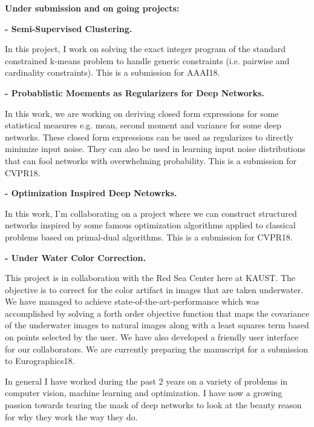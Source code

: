 \documentclass[article]{llncs}
\begin{document}
\noindent \textbf{Under submission and on going projects:}

\noindent \textbf{- Semi-Supervised Clustering.}

In this project, I work on solving the exact integer program of the standard constrained k-means problem to handle generic constraints (i.e. pairwise and cardinality constraints). This is a submission for AAAI18.
\newline



\noindent \textbf{- Probablistic Moements as Regularizers for Deep Networks.}

In this work, we are working on deriving closed form expressions for some statistical measures e.g. mean, second moment and variance for some deep networks. These closed form expressions can be used as regularizes to directly minimize input noise. They can also be used in learning input noise distributions that can fool networks with overwhelming probability. This is a submission for CVPR18.
\newline


\noindent \textbf{- Optimization Inspired Deep Netowrks.}

In this work, I'm collaborating on a project where we can construct structured networks inspired by some famous optimization algorithms applied to classical problems based on primal-dual algorithms. This is a submission for CVPR18.
\newline

\noindent \textbf{- Under Water Color Correction.}

This project is in collaboration with the Red Sea Center here at KAUST. The objective is to correct for the color artifact in images that are taken underwater. We have managed to achieve state-of-the-art-performance which was accomplished by solving a forth order objective function that maps the covariance of the underwater images to natural images along with a least squares term based on points selected by the user. We have also developed a friendly user interface for our collaborators. We are currently preparing the manuscript for a submission to Eurographics18.
\newline
\newline

In general I have worked during the past 2 years on a variety of problems in computer vision, machine learning and optimization. I have now a growing passion towards tearing the mask of deep networks to look at the beauty reason for why they work the way they do. 




\clearpage



\end{document}
